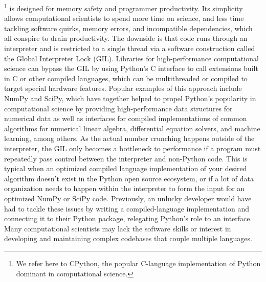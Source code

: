 \documentclass{IEEEcsmag}
\begin{document}
\maketitle
{}\footnote{We refer here to CPython, the popular C-language implementation of Python dominant in computational science.} is designed for memory safety and programmer productivity. Its simplicity allows computational scientists to spend more time on science, and less time tackling software quirks, memory errors, and incompatible dependencies, which all conspire to drain productivity.
The downside is that code runs through an interpreter and is restricted to a single thread via a software construction called the Global Interpreter Lock (GIL). Libraries for high-performance computational science can bypass the GIL by using Python's C interface to call extensions built in C or other compiled languages, which can be multithreaded or compiled to target special hardware features. Popular examples of this approach include NumPy and SciPy, which have together helped to propel Python's popularity in computational science by providing high-performance data structures for numerical data as well as interfaces for compiled implementations of common algorithms for numerical linear algebra, differential equation solvers, and machine learning, among others.
As the actual number crunching happens outside of the interpreter, the GIL only becomes a bottleneck to performance if a program must repeatedly pass control between the interpreter and non-Python code. This is  typical when an optimized compiled language implementation of your desired algorithm doesn't exist in the Python open source ecosystem, or if a lot of data organization needs to happen within the interpreter to form the input for an optimized NumPy or SciPy code. Previously, an unlucky developer would have had to tackle these issues by writing a compiled-language implementation and connecting it to their Python package, relegating Python's role to an interface. Many computational scientists may lack the software skills or interest in developing and maintaining complex codebases that couple multiple languages.
\end{document}

